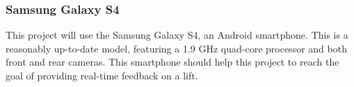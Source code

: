 \subsubsection{Samsung Galaxy S4}

This project will use the Samsung Galaxy S4\cite{s4}, an Android smartphone. This is a reasonably up-to-date model, featuring a 1.9 GHz quad-core processor and both front and rear cameras. This smartphone should help this project to reach the goal of providing real-time feedback on a lift.